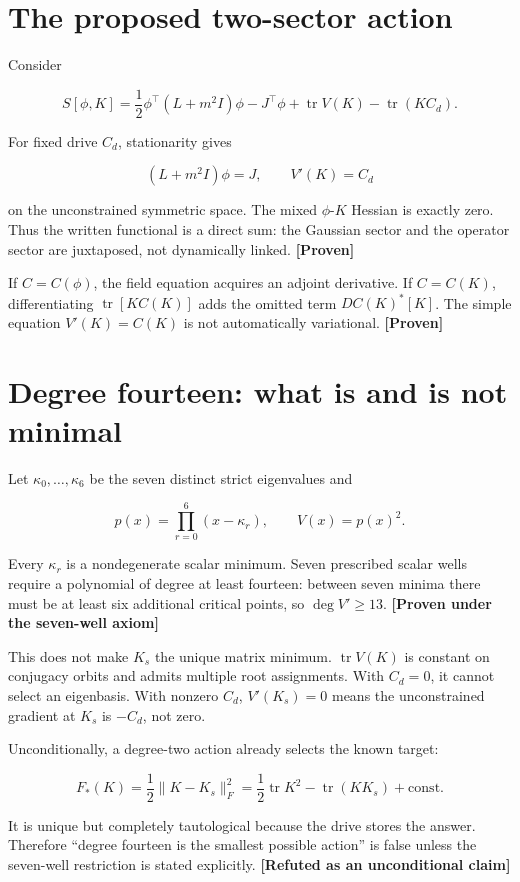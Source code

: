 \documentclass[11pt,a4paper,openany]{report}
\newcommand{\statusProven}{\textcolor{fingreen}{[Proven]}}
\begin{document}
\section{The proposed two-sector action}

Consider

\[
S[\phi,K]
=\frac12\phi^\top(L+m^2I)\phi-J^\top\phi
+\operatorname{tr}V(K)-\operatorname{tr}(KC_d).
\]

For fixed drive \(C_d\), stationarity gives

\[
(L+m^2I)\phi=J,
\qquad
V'(K)=C_d
\]

on the unconstrained symmetric space. The mixed \(\phi\)-\(K\) Hessian is exactly zero. Thus the written functional is a direct sum: the Gaussian sector and the operator sector are juxtaposed, not dynamically linked. \textbf{\statusProven{}}

If \(C=C(\phi)\), the field equation acquires an adjoint derivative. If \(C=C(K)\), differentiating \(\operatorname{tr}[KC(K)]\) adds the omitted term \(DC(K)^*[K]\). The simple equation \(V'(K)=C(K)\) is not automatically variational. \textbf{\statusProven{}}

\section{Degree fourteen: what is and is not minimal}

Let \(\kappa_0,\ldots,\kappa_6\) be the seven distinct strict eigenvalues and

\[
p(x)=\prod_{r=0}^6(x-\kappa_r),
\qquad V(x)=p(x)^2.
\]

Every \(\kappa_r\) is a nondegenerate scalar minimum. Seven prescribed scalar wells require a polynomial of degree at least fourteen: between seven minima there must be at least six additional critical points, so \(\deg V'\ge13\). \textbf{[Proven under the seven-well axiom]}

This does not make \(K_s\) the unique matrix minimum. \(\operatorname{tr}V(K)\) is constant on conjugacy orbits and admits multiple root assignments. With \(C_d=0\), it cannot select an eigenbasis. With nonzero \(C_d\), \(V'(K_s)=0\) means the unconstrained gradient at \(K_s\) is \(-C_d\), not zero.

Unconditionally, a degree-two action already selects the known target:

\[
F_*(K)=\frac12\|K-K_s\|_F^2
=\frac12\operatorname{tr}K^2-\operatorname{tr}(KK_s)+\text{const}.
\]

It is unique but completely tautological because the drive stores the answer. Therefore “degree fourteen is the smallest possible action” is false unless the seven-well restriction is stated explicitly. \textbf{[Refuted as an unconditional claim]}
\end{document}

